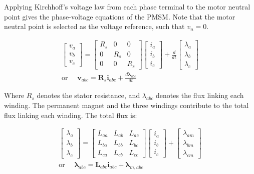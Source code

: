 \documentclass{article}
\begin{document}
Applying Kirchhoff's voltage law from each phase terminal to the motor
neutral point gives the phase-voltage equations of the PMSM. Note that the motor neutral point is selected as the voltage reference, such that $v_n=0$.

\begin{equation}
\begin{gathered}
\begin{bmatrix}
\label{abc-kvl}
v_a \\
v_b \\
v_c
\end{bmatrix}
=
\begin{bmatrix}
R_s & 0 & 0 \\
0 & R_s & 0 \\
0 & 0 & R_s
\end{bmatrix}
\begin{bmatrix}
i_a \\
i_b \\
i_c
\end{bmatrix}
+
\frac{d}{dt}
\begin{bmatrix}
\lambda_a \\
\lambda_b \\
\lambda_c
\end{bmatrix}
\\[10pt]
\text{or } \quad \mathbf{v}_{abc} = \mathbf{R}_s\mathbf{i}_{abc} + \frac{d\boldsymbol{\lambda}_{abc}}{dt}
\end{gathered}
\end{equation}

Where $R_s$ denotes the stator resistance, and $\lambda_{abc}$ denotes the flux linking each winding. The permanent magnet and the three windings contribute to the total flux linking each winding. The total flux is:

\begin{equation}
\label{eqn2}
\begin{gathered}
\begin{bmatrix}
\lambda_a \\
\lambda_b \\
\lambda_c
\end{bmatrix}
=
\begin{bmatrix}
L_{aa} & L_{ab} & L_{ac} \\
L_{ba} & L_{bb} & L_{bc} \\
L_{ca} & L_{cb} & L_{cc}
\end{bmatrix}
\begin{bmatrix}
i_a \\
i_b \\
i_c
\end{bmatrix}
+
\begin{bmatrix}
\lambda_{am} \\
\lambda_{bm} \\
\lambda_{cm}
\end{bmatrix}
\\[10pt]
\text{or } \quad \boldsymbol{\lambda}_{abc} = \mathbf{L}_{abc}\mathbf{i}_{abc} + \boldsymbol{\lambda}_{m,abc}
\end{gathered}
\end{equation}
\end{document}
